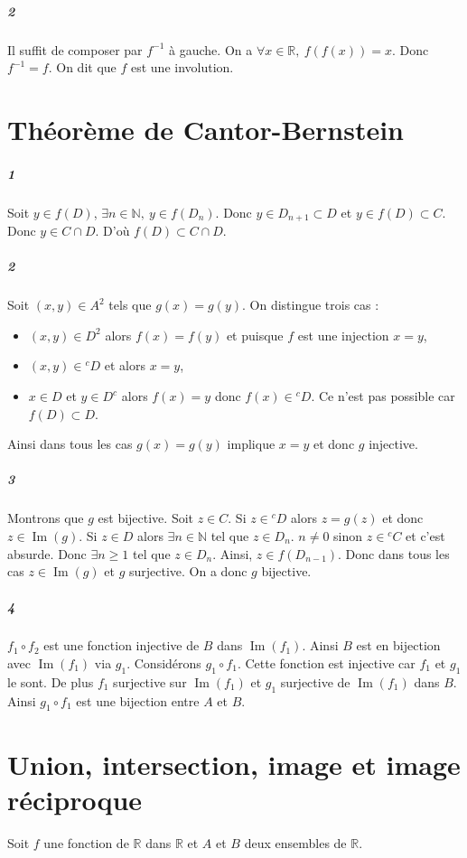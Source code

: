 \documentclass[10pt,a4paper]{article}
\begin{document}
\subparagraph{2}Il suffit de composer par $f^{-1}$ à gauche. On a $\forall x \in \mathbb{R}, \ f(f(x)) = x$. Donc $f^{-1}=f$. On dit que $f$ est une involution.
\section{Théorème de Cantor-Bernstein}
\subparagraph{1}Soit $y \in f(D)$, $\exists n \in \mathbb{N}, \ y \in f(D_n)$. Donc $y \in D_{n+1} \subset D$ et $y \in f(D) \subset C$. Donc $y \in C \cap D$. D'où $f(D) \subset C \cap D$.

\subparagraph{2} Soit $(x,y)\in A^2$ tels que $g(x) = g(y)$. On distingue trois cas :
\begin{itemize}
\item $(x,y) \in D^2$ alors $f(x) = f(y)$ et puisque $f$ est une injection $x=y$,
\item $(x,y) \in {}^cD$ et alors $x=y$,
\item $x \in D$ et $y \in D^c$ alors $f(x) = y$ donc $f(x) \in {}^cD$. Ce n'est pas possible car $f(D) \subset D$.
\end{itemize}
Ainsi dans tous les cas $g(x) = g(y)$ implique $x=y$ et donc $g$ injective.

\subparagraph{3}Montrons que $g$ est bijective. Soit $z \in C$. Si $z \in {}^cD$ alors $z = g(z)$ et donc $z \in \operatorname{Im}(g)$. Si $z \in D$ alors $\exists n \in \mathbb{N}$ tel que $z \in D_n$. $n \neq 0$ sinon $z \in {}^c C$ et c'est absurde. Donc $\exists n \ge 1$ tel que $z \in D_n$. Ainsi, $z \in f(D_{n-1})$. Donc dans tous les cas $z \in \operatorname{Im}(g)$ et $g$ surjective. On a donc $g$ bijective.

\subparagraph{4}$f_1 \circ f_2$ est une fonction injective de $B$ dans $\operatorname{Im}(f_1)$. Ainsi $B$ est en bijection avec $\operatorname{Im}(f_1)$ via $g_1$. Considérons $g_1 \circ f_1$. Cette fonction est injective car $f_1$ et $g_1$ le sont. De plus $f_1$ surjective sur $\operatorname{Im}(f_1)$ et $g_1$ surjective de $\operatorname{Im}(f_1)$ dans $B$. Ainsi $g_1 \circ f_1$ est une bijection entre $A$ et $B$.


\section{Union, intersection, image et image réciproque}
Soit $f$ une fonction de $\mathbb{R}$ dans $\mathbb{R}$ et $A$ et $B$ deux ensembles de $\mathbb{R}$.
\end{document}
